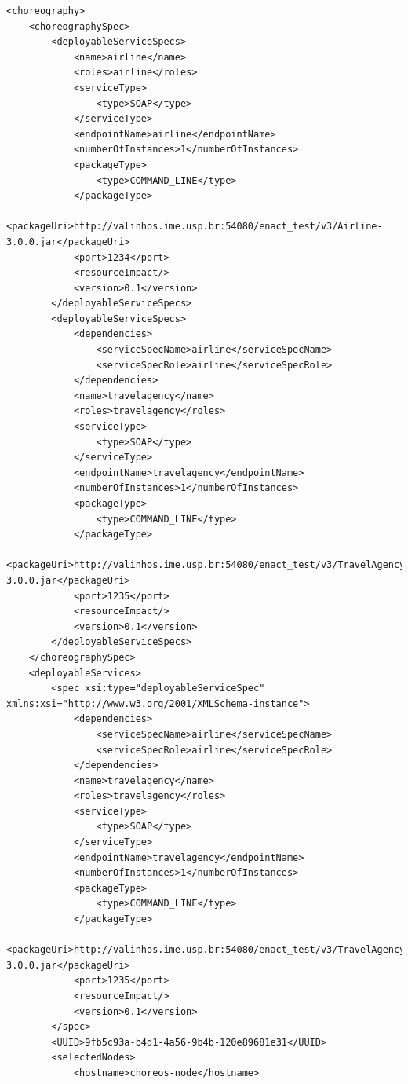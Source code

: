 {\begin{lstlisting}[breaklines, caption=Choreography XML representation example., label=lst:chor_xml]
<choreography>
    <choreographySpec>
        <deployableServiceSpecs>
            <name>airline</name>
            <roles>airline</roles>
            <serviceType>
                <type>SOAP</type>
            </serviceType>
            <endpointName>airline</endpointName>
            <numberOfInstances>1</numberOfInstances>
            <packageType>
                <type>COMMAND_LINE</type>
            </packageType>
            <packageUri>http://valinhos.ime.usp.br:54080/enact_test/v3/Airline-3.0.0.jar</packageUri>
            <port>1234</port>
            <resourceImpact/>
            <version>0.1</version>
        </deployableServiceSpecs>
        <deployableServiceSpecs>
            <dependencies>
                <serviceSpecName>airline</serviceSpecName>
                <serviceSpecRole>airline</serviceSpecRole>
            </dependencies>
            <name>travelagency</name>
            <roles>travelagency</roles>
            <serviceType>
                <type>SOAP</type>
            </serviceType>
            <endpointName>travelagency</endpointName>
            <numberOfInstances>1</numberOfInstances>
            <packageType>
                <type>COMMAND_LINE</type>
            </packageType>
            <packageUri>http://valinhos.ime.usp.br:54080/enact_test/v3/TravelAgency-3.0.0.jar</packageUri>
            <port>1235</port>
            <resourceImpact/>
            <version>0.1</version>
        </deployableServiceSpecs>
    </choreographySpec>
    <deployableServices>
        <spec xsi:type="deployableServiceSpec" xmlns:xsi="http://www.w3.org/2001/XMLSchema-instance">
            <dependencies>
                <serviceSpecName>airline</serviceSpecName>
                <serviceSpecRole>airline</serviceSpecRole>
            </dependencies>
            <name>travelagency</name>
            <roles>travelagency</roles>
            <serviceType>
                <type>SOAP</type>
            </serviceType>
            <endpointName>travelagency</endpointName>
            <numberOfInstances>1</numberOfInstances>
            <packageType>
                <type>COMMAND_LINE</type>
            </packageType>
            <packageUri>http://valinhos.ime.usp.br:54080/enact_test/v3/TravelAgency-3.0.0.jar</packageUri>
            <port>1235</port>
            <resourceImpact/>
            <version>0.1</version>
        </spec>
        <UUID>9fb5c93a-b4d1-4a56-9b4b-120e89681e31</UUID>
        <selectedNodes>
            <hostname>choreos-node</hostname>

\end{lstlisting}}
